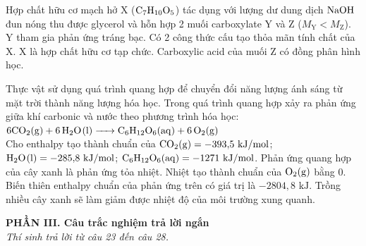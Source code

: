 \documentclass[11pt,a4paper]{article}
\begin{document}
\begin{ex}
Hợp chất hữu cơ mạch hở X ($\ce{C7H10O5}$) tác dụng với lượng dư dung dịch $\ce{NaOH}$ đun nóng thu được glycerol và hỗn hợp 2 muối carboxylate Y và Z ($M_{\text{Y}} < M_{\text{Z}}$).
\choiceTF
{\True Y tham gia phản ứng tráng bạc.}
{Có 2 công thức cấu tạo thỏa mãn tính chất của X.}
{\True X là hợp chất hữu cơ tạp chức.}
{Carboxylic acid của muối Z có đồng phân hình học.}

\end{ex}
\begin{ex}
Thực vật sử dụng quá trình quang hợp để chuyển đổi năng lượng ánh sáng từ mặt trời thành năng lượng hóa học. Trong quá trình quang hợp xảy ra phản ứng giữa khí carbonic và nước theo phương trình hóa học:\\
$6\ce{CO2(g) + 6H2O(l) -> C6H12O6(aq) + 6O2(g)}$\\
Cho enthalpy tạo thành chuẩn của $\ce{CO2(g)} = -393{,}5\text{ kJ/mol}$; $\ce{H2O(l)} = -285{,}8\text{ kJ/mol}$; $\ce{C6H12O6(aq)} = -1271\text{ kJ/mol}$.
\choiceTF
{Phản ứng quang hợp của cây xanh là phản ứng tỏa nhiệt.}
{\True Nhiệt tạo thành chuẩn của $\ce{O2(g)}$ bằng 0.}
{Biến thiên enthalpy chuẩn của phản ứng trên có giá trị là $-2804{,}8\text{ kJ}$.}
{\True Trồng nhiều cây xanh sẽ làm giảm được nhiệt độ của môi trường xung quanh.}

\end{ex}
\vspace{6pt}
\noindent
{\color{mainGreen}\textbf{\large PHẦN III. Câu trắc nghiệm trả lời ngắn}}\\
\textit{\small Thí sinh trả lời từ câu 23 đến câu 28.}
\vspace{2pt}
\end{document}
